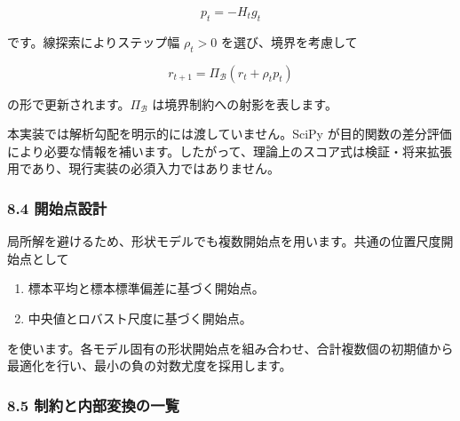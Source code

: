 \documentclass[
]{article}
\providecommand{\tightlist}{%
  \setlength{\itemsep}{0pt}\setlength{\parskip}{0pt}}
\begin{document}
\[
p_t=-H_tg_t
\]

です。線探索によりステップ幅 \(\rho_t>0\) を選び、境界を考慮して

\[
r_{t+1}=\Pi_{\mathcal{B}}(r_t+\rho_t p_t)
\]

の形で更新されます。\(\Pi_{\mathcal{B}}\) は境界制約への射影を表します。

本実装では解析勾配を明示的には渡していません。SciPy
が目的関数の差分評価により必要な情報を補います。したがって、理論上のスコア式は検証・将来拡張用であり、現行実装の必須入力ではありません。

\hypertarget{ux958bux59cbux70b9ux8a2dux8a08}{%
\subsubsection{8.4 開始点設計}\label{ux958bux59cbux70b9ux8a2dux8a08}}

局所解を避けるため、形状モデルでも複数開始点を用います。共通の位置尺度開始点として

\begin{enumerate}
\def\labelenumi{\arabic{enumi}.}
\tightlist
\item
  標本平均と標本標準偏差に基づく開始点。
\item
  中央値とロバスト尺度に基づく開始点。
\end{enumerate}

を使います。各モデル固有の形状開始点を組み合わせ、合計複数個の初期値から最適化を行い、最小の負の対数尤度を採用します。

\hypertarget{ux5236ux7d04ux3068ux5185ux90e8ux5909ux63dbux306eux4e00ux89a7}{%
\subsubsection{8.5
制約と内部変換の一覧}\label{ux5236ux7d04ux3068ux5185ux90e8ux5909ux63dbux306eux4e00ux89a7}}
\end{document}
